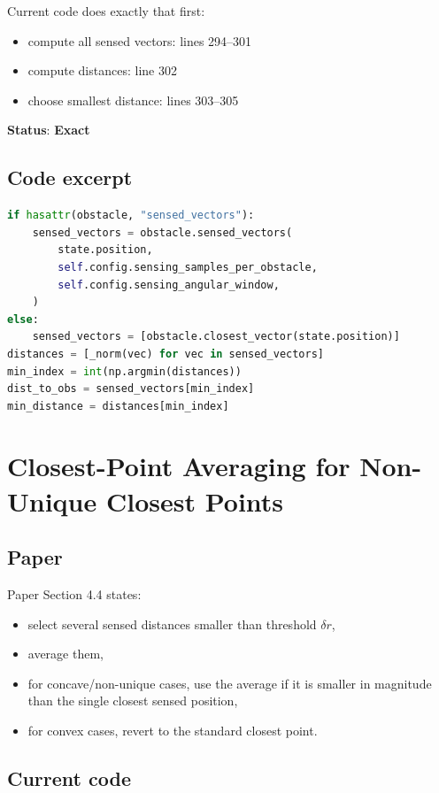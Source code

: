 \documentclass[11pt]{article}
\begin{document}
Current code does exactly that first:

\begin{itemize}[leftmargin=*]
  \item compute all sensed vectors: lines 294--301
  \item compute distances: line 302
  \item choose smallest distance: lines 303--305
\end{itemize}

\textbf{Status}: \textbf{Exact}

\subsection*{Code excerpt}

\begin{lstlisting}[language=Python]
if hasattr(obstacle, "sensed_vectors"):
    sensed_vectors = obstacle.sensed_vectors(
        state.position,
        self.config.sensing_samples_per_obstacle,
        self.config.sensing_angular_window,
    )
else:
    sensed_vectors = [obstacle.closest_vector(state.position)]
distances = [_norm(vec) for vec in sensed_vectors]
min_index = int(np.argmin(distances))
dist_to_obs = sensed_vectors[min_index]
min_distance = distances[min_index]
\end{lstlisting}

\section*{Closest-Point Averaging for Non-Unique Closest Points}

\subsection*{Paper}

Paper Section 4.4 states:

\begin{itemize}[leftmargin=*]
  \item select several sensed distances smaller than threshold \(\delta r\),
  \item average them,
  \item for concave/non-unique cases, use the average if it is smaller in
  magnitude than the single closest sensed position,
  \item for convex cases, revert to the standard closest point.
\end{itemize}

\subsection*{Current code}
\end{document}
